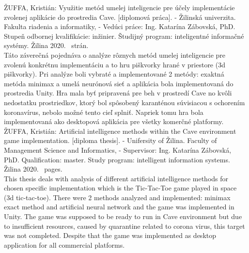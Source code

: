 ŽUFFA, Kristián: Využitie metód umelej inteligencie pre účely implementácie zvolenej aplikácie do prostredia Cave.
[diplomová práca].
- Žilinská univerzita.
Fakulta riadenia a informatiky, -
Vedúci práce: Ing. Katarína Zábovská, PhD.
Stupeň odbornej kvalifikácie: inžinier.
Študijný program: inteligentné informačné systémy.
Žilina 2020.~\pageref{LastPage} strán.
\\
Táto záverečná pojednáva o analýze rôznych metód umelej inteligencie pre zvolenú konkrétnu implementáciu a to hru
piškvorky hrané v priestore (3d piškvorky).
Pri analýze boli vybraté a implementované 2 metódy: exaktná metóda minimax a umelá neurónová sieť a aplikácia bola
implementovaná do prostredia Unity.
Hra mala byť pripravená pre beh v prostredí Cave no kvôli nedostatku prostriedkov, ktorý bol spôsobený karanténou
súvisiacou s ochorením koronavírus, nebolo možné tento cieľ splniť.
Napriek tomu hra bola implementovaná ako desktopová aplikácia pre všetky komerčné platformy.
\\

ŽUFFA, Kristián: Artificial intelligence methods within the Cave environment game implementation.
[diploma thesis].
- Unifersity of Žilina.
Faculty of Management Science and Informatics, -
Supervisor: Ing. Katarína Zábovská, PhD.
Qualification: master.
Study program: intelligent information systems.
Žilina 2020.~\pageref{LastPage} pages.
\\
This thesis deals with analysis of different artificial intelligence methods for chosen specific implementation which
is the Tic-Tac-Toe game played in space (3d tic-tac-toe).
There were 2 methods analyzed and implemented: minimax exact method and artificial neural network and the game was
implemented in Unity.
The game was supposed to be ready to run in Cave environment but due to insufficient resources, caused by quarantine
related to corona virus, this target was not completed.
Despite that the game was implemented as desktop application for all commercial platforms.
\\

